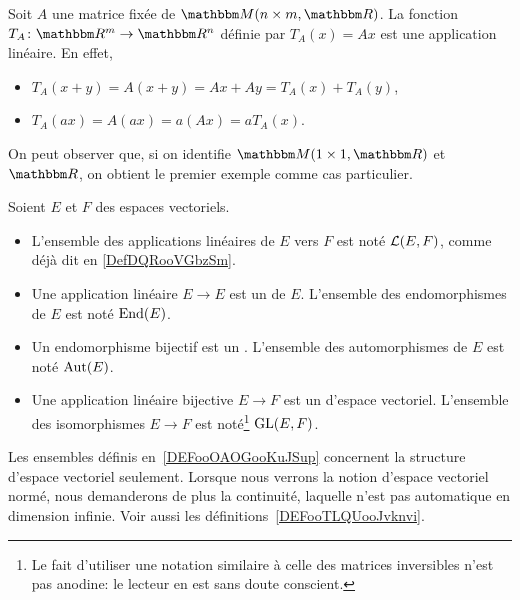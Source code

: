 \begin{example}\label{exampleT_A}
	Soit $A$ une matrice fixée de $\eM(n \times m, \eR)$. La fonction $T_A\colon \eR^m\to \eR^n$ définie par $T_A(x)=Ax$ est une application linéaire. En effet,
    \begin{itemize}
        \item  $T_A(x+y)= A(x+y)= Ax + Ay = T_A(x)+T_A(y)$,
        \item $T_A(ax)=A(ax)= a(Ax) = a T_A(x)$.
    \end{itemize}
\end{example}

On peut observer que, si on identifie $\eM(1 \times 1, \eR)$ et $\eR$, on obtient le premier exemple comme cas particulier.

\begin{definition}      \label{DEFooOAOGooKuJSup}
    Soient \( E\) et \( F\) des espaces vectoriels.
    \begin{itemize}
        \item
            L'ensemble des applications linéaires de \( E\) vers \( F\) est noté $\mathcal{L}(E,F)$, comme déjà dit en \ref{DefDQRooVGbzSm}.
        \item Une application linéaire \( E\to E\) est un  de \( E\). L'ensemble des endomorphismes de \( E\) est noté \( \operatorname{End}(E)\).
        \item Un endomorphisme bijectif est un . L'ensemble des automorphismes de \( E\) est noté \( \operatorname{Aut}(E)\).
        \item
            Une application linéaire bijective \( E\to F\) est un  d'espace vectoriel. L'ensemble des isomorphismes \( E\to F\) est noté\footnote{Le fait d'utiliser une notation similaire à celle des matrices inversibles n'est pas anodine: le lecteur en est sans doute conscient.} \( \textup{GL}(E,F)\).
    \end{itemize}
\end{definition}

\begin{remark}
    Les ensembles définis en~\ref{DEFooOAOGooKuJSup} concernent la structure d'espace vectoriel seulement. Lorsque nous verrons la notion d'espace vectoriel normé, nous demanderons de plus la continuité, laquelle n'est pas automatique en dimension infinie. Voir aussi les définitions~\ref{DEFooTLQUooJvknvi}.
\end{remark}

